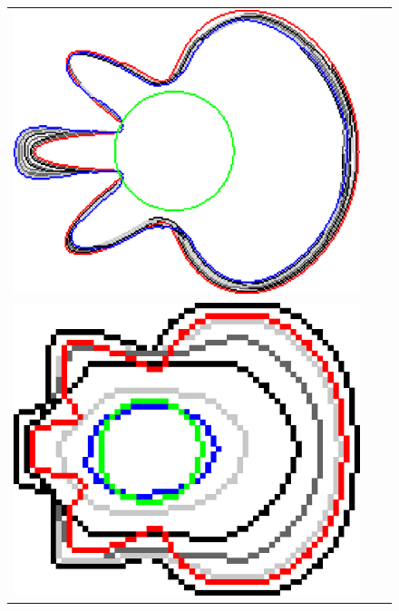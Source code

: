 \begin{figure}
\begin{tabular}{ccc}
\includegraphics[scale=0.25]{figures/chapter5/flow/flower/radius_3/mdca/elastica/len_pen_0.01000/jonctions_1/curve_segs_4/best/gs_0.25000/summary.pdf}\\[2em]
\includegraphics[scale=0.25]{figures/chapter5/mdca-larger-neighborhood/flower/0.01/1.0/summary.pdf} &

\end{tabular}
\end{figure}
